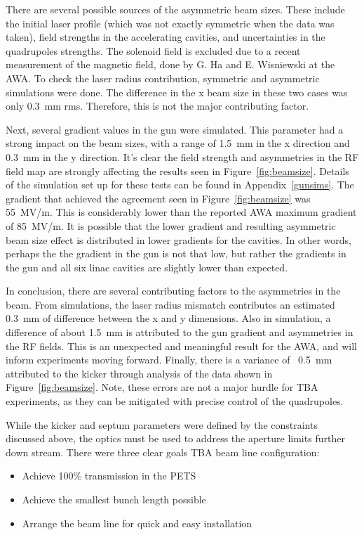 There are several possible sources of the asymmetric beam sizes. 
These include the initial laser profile (which was not exactly symmetric
when the data was taken), field strengths in the accelerating cavities, 
and uncertainties in the quadrupoles strengths.
The solenoid field is excluded due to a recent measurement of the magnetic field, 
done by G. Ha and E. Wisniewski at the AWA. 
To check the laser radius contribution, symmetric and asymmetric simulations were done.
The difference in the x beam size in these two cases was only \SI{0.3}{mm} rms. 
Therefore, this is not the major contributing factor.

Next, several gradient values in the gun were simulated. 
This parameter had a strong impact on the beam sizes, with a range of \SI{1.5}{mm} 
in the x direction and \SI{0.3}{mm} in the y direction.
It's clear the field strength and asymmetries in the RF field map 
are strongly affecting the results seen in Figure~\ref{fig:beamsize}.
Details of the simulation set up for these tests can be found in Appendix~\ref{gunsims}.
The gradient that achieved the agreement seen in Figure~\ref{fig:beamsize} was \SI{55}{MV/m}.
This is considerably lower than the reported AWA maximum gradient of \SI{85}{MV/m}.
It is possible that the lower gradient and resulting asymmetric beam size effect is 
distributed in lower gradients for the cavities. 
In other words, perhaps the the gradient in the gun is not that low, but rather
the gradients in the gun and all six linac cavities are slightly lower than expected.

In conclusion, there are several contributing factors to the asymmetries in the beam.
From simulations, the laser radius mismatch contributes an estimated \SI{0.3}{mm} of difference 
between the x and y dimensions. Also in simulation, a difference of about \SI{1.5}{mm} 
is attributed to the gun gradient and asymmetries in the RF fields. 
This is an unexpected and meaningful result for the AWA, and will inform experiments moving forward.
Finally, there is a variance of ~\SI{0.5}{mm} attributed to the kicker through analysis of the 
data shown in Figure~\ref{fig:beamsize}.
Note, these errors are not a major hurdle for TBA experiments, as they can
be mitigated with precise control of the quadrupoles.



While  the kicker and septum parameters were defined by the constraints discussed above, 
the optics must be used to address the aperture limits further down stream.
There were three clear goals TBA beam line configuration: 
\begin{itemize}
	\item Achieve 100\% transmission in the PETS
	\item Achieve the smallest bunch length possible
	\item Arrange the beam line for quick and easy installation
\end{itemize}

